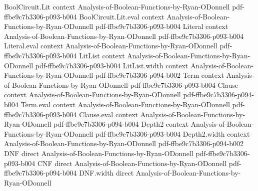 \begin{theorem}
\leanok
{}
\proofstep
  {BoolCircuit.Lit}
  {context}
  {Analysis-of-Boolean-Functions-by-Ryan-ODonnell}
  {pdf-ffbe9c7b3306-p093-b004}
\proofstep
  {BoolCircuit.Lit.eval}
  {context}
  {Analysis-of-Boolean-Functions-by-Ryan-ODonnell}
  {pdf-ffbe9c7b3306-p093-b004}
\proofstep
  {Literal}
  {context}
  {Analysis-of-Boolean-Functions-by-Ryan-ODonnell}
  {pdf-ffbe9c7b3306-p093-b004}
\proofstep
  {Literal.eval}
  {context}
  {Analysis-of-Boolean-Functions-by-Ryan-ODonnell}
  {pdf-ffbe9c7b3306-p093-b004}
\proofstep
  {LitList}
  {context}
  {Analysis-of-Boolean-Functions-by-Ryan-ODonnell}
  {pdf-ffbe9c7b3306-p093-b004}
\proofstep
  {LitList.width}
  {context}
  {Analysis-of-Boolean-Functions-by-Ryan-ODonnell}
  {pdf-ffbe9c7b3306-p094-b002}
\proofstep
  {Term}
  {context}
  {Analysis-of-Boolean-Functions-by-Ryan-ODonnell}
  {pdf-ffbe9c7b3306-p093-b004}
\proofstep
  {Clause}
  {context}
  {Analysis-of-Boolean-Functions-by-Ryan-ODonnell}
  {pdf-ffbe9c7b3306-p094-b004}
\proofstep
  {Term.eval}
  {context}
  {Analysis-of-Boolean-Functions-by-Ryan-ODonnell}
  {pdf-ffbe9c7b3306-p093-b004}
\proofstep
  {Clause.eval}
  {context}
  {Analysis-of-Boolean-Functions-by-Ryan-ODonnell}
  {pdf-ffbe9c7b3306-p094-b004}
\proofstep
  {Depth2}
  {context}
  {Analysis-of-Boolean-Functions-by-Ryan-ODonnell}
  {pdf-ffbe9c7b3306-p093-b004}
\proofstep
  {Depth2.width}
  {context}
  {Analysis-of-Boolean-Functions-by-Ryan-ODonnell}
  {pdf-ffbe9c7b3306-p094-b002}
\proofstep
  {DNF}
  {direct}
  {Analysis-of-Boolean-Functions-by-Ryan-ODonnell}
  {pdf-ffbe9c7b3306-p093-b004}
\proofstep
  {CNF}
  {direct}
  {Analysis-of-Boolean-Functions-by-Ryan-ODonnell}
  {pdf-ffbe9c7b3306-p094-b004}
\proofstep
  {DNF.width}
  {direct}
  {Analysis-of-Boolean-Functions-by-Ryan-ODonnell}

\end{theorem}
